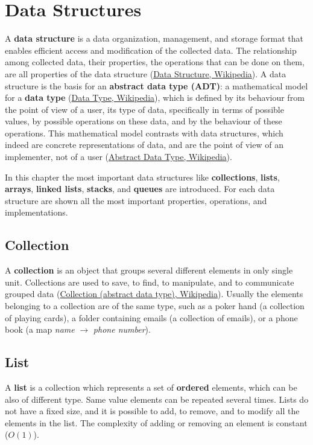 \chapter{Data Structures}
\label{chp:datastrucutres}
A \textbf{data structure} is a data organization, management, and storage format that enables efficient access and modification of the collected data. The relationship among collected data, their properties, the operations that can be done on them, are all properties of the data structure \cite{wikidatastructure} (\href{https://en.wikipedia.org/wiki/Data_structure}{Data Structure, Wikipedia}). A data structure is the basis for an \textbf{abstract data type (ADT)}: a mathematical model for a \textbf{data type} \cite{wikidatatype} (\href{https://en.wikipedia.org/wiki/Data_type}{Data Type, Wikipedia}), which is defined by its behaviour from the point of view of a user, its type of data, specifically in terms of possible values, by possible operations on these data, and by the behaviour of these operations. This mathematical model contrasts with data structures, which indeed are concrete representations of data, and are the point of view of an implementer, not of a user \cite{wikiabstractdatatype} (\href{https://en.wikipedia.org/wiki/Abstract_data_type}{Abstract Data Type, Wikipedia}).

In this chapter the most important data structures like \textbf{collections}, \textbf{lists}, \textbf{arrays}, \textbf{linked lists}, \textbf{stacks}, and \textbf{queues} are introduced. For each data structure are shown all the most important properties, operations, and implementations.

\section{Collection}
A \textbf{collection} is an object that groups several different elements in only single unit. Collections are used to save, to find, to manipulate, and to communicate grouped data \cite{wikicollection} (\href{https://en.wikipedia.org/wiki/Collection_(abstract_data_type)}{Collection (abstract data type), Wikipedia}). Usually the elements belonging to a collection are of the same type, such as a poker hand (a collection of playing cards), a folder containing emails (a collection of emails), or a phone book (a map \textit{name} \(\rightarrow\) \textit{phone number}).

\section{List}
A \textbf{list} is a collection which represents a set of \textbf{ordered} elements, which can be also of different type. Same value elements can be repeated several times. Lists do not have a fixed size, and it is possible to add, to remove, and to modify all the elements in the list. The complexity of adding or removing an element is constant (\(O(1)\)).

